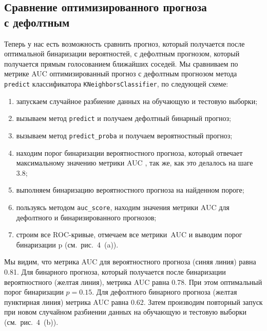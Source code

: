 \subsection{Сравнение оптимизированного прогноза\\ с дефолтным}

Теперь у нас есть возможность сравнить прогноз, который получается после оптимальной бинаризации вероятностей, с дефолтным прогнозом, который получается прямым голосованием ближайших соседей. 
Мы сравниваем по метрике AUC оптимизированный прогноз с дефолтным прогнозом метода \texttt{predict} классификатора \texttt{KNeighborsClassifier}, по следующей схеме:
\medskip
\begin{enumerate}
	\item запускаем случайное разбиение данных на обучающую и тестовую выборки;
	\item вызываем метод \texttt{predict} и получаем дефолтный бинарный прогноз;
	\item вызываем метод \texttt{predict\_proba} и получаем вероятностный прогноз;
	\item находим порог бинаризации вероятностного прогноза, который отвечает максимальному значению метрики AUC , так же, как это делалось на шаге 3.8;
	\item выполняем бинаризацию вероятностного прогноза на найденном пороге;
	\item пользуясь методом \texttt{auc\_score}, находим значения метрики AUC для дефолтного и бинаризированного прогнозов;
	\item  строим все ROC-кривые, отмечаем все метрики AUC и выводим порог бинаризации p (см. рис. 4 (a)).

\end{enumerate}
\medskip

Мы видим, что метрика AUC для вероятностного прогноза (синяя линия) равна 0.81. Для бинарного прогноза, который получается после бинаризации вероятностного (желтая линия), метрика AUC равна 0.78. При этом оптимальный порог бинаризации $p = 0.15$. Для дефолтного бинарного прогноза (желтая пунктирная линия) метрика AUC равна 0.62. Затем производим повторный запуск при новом случайном разбиении данных на обучающую и тестовую выборки (см. рис. 4 (b)).

